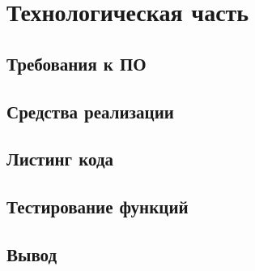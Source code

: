 \chapter{Технологическая часть}

\section{Требования к ПО}

\section{Средства реализации}

\section{Листинг кода}

\section{Тестирование функций}

\section*{Вывод}

